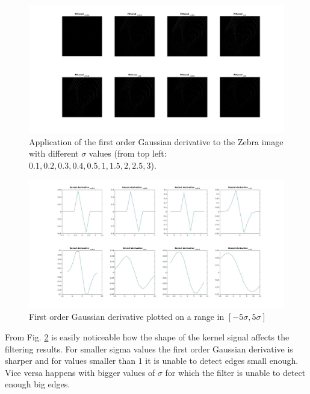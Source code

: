 \documentclass[11pt]{article}
\begin{document}
\begin{figure}[H] \centering
	\includegraphics[width=1\textwidth]{imgs/zebra_deriv.jpg}
	\caption{Application of the first order Gaussian derivative to the Zebra
		image with different $\sigma$ values (from top left: $0.1, 0.2,
		0.3, 0.4, 0.5, 1, 1.5, 2, 2.5, 3$).}
	\label{fig:zebra_deriv}
\end{figure}

\begin{figure}[H] \centering
	\includegraphics[width=1\textwidth]{imgs/gauss_deriv.jpg}
	\caption{First order Gaussian derivative plotted on a range in
		$[-5\sigma, 5\sigma]$}
	\label{fig:gauss_deriv}
\end{figure}

From Fig. \ref{fig:gauss_deriv} is easily noticeable how the shape of the kernel
signal affects the filtering results. For smaller sigma values the first order
Gaussian derivative is sharper and for values smaller than $1$ it is unable to
detect edges small enough. Vice versa happens with bigger values of $\sigma$ for
which the filter is unable to detect enough big edges.
\end{document}
